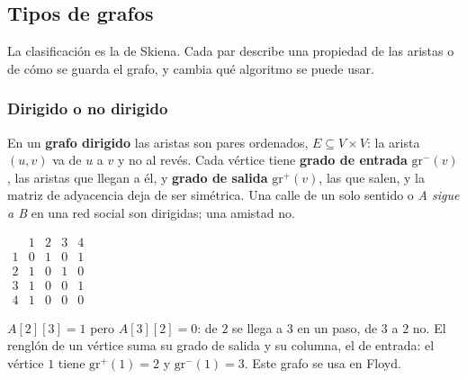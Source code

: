 \documentclass[11pt,letterpaper]{article}
\begin{document}

\subsection*{Tipos de grafos}

La clasificación es la de Skiena. Cada par describe una propiedad de
las aristas o de cómo se guarda el grafo, y cambia qué algoritmo se
puede usar.

\subsubsection*{Dirigido o no dirigido}

En un \textbf{grafo dirigido} las aristas son pares ordenados,
$E \subseteq V \times V$: la arista $(u, v)$ va de $u$ a $v$ y no al
revés. Cada vértice tiene \textbf{grado de entrada}
$\text{gr}^{-}(v)$, las aristas que llegan a él, y \textbf{grado de
salida} $\text{gr}^{+}(v)$, las que salen, y la matriz de adyacencia
deja de ser simétrica. Una calle de un solo sentido o \textit{A sigue
a B} en una red social son dirigidas; una amistad no.

\begin{center}
\hspace{1.2cm}
$\begin{array}{c|cccc}
    & 1 & 2 & 3 & 4 \\ \hline
  1 & 0 & 1 & 0 & 1 \\
  2 & 1 & 0 & 1 & 0 \\
  3 & 1 & 0 & 0 & 1 \\
  4 & 1 & 0 & 0 & 0
\end{array}$
\end{center}

$A[2][3] = 1$ pero $A[3][2] = 0$: de $2$ se llega a $3$ en un paso,
de $3$ a $2$ no. El renglón de un vértice suma su grado de salida y
su columna, el de entrada: el vértice $1$ tiene $\text{gr}^{+}(1) = 2$
y $\text{gr}^{-}(1) = 3$. Este grafo se usa en Floyd.
\end{document}
